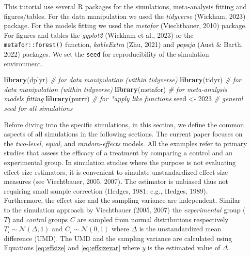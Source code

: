 \documentclass[
  man,floatsintext]{apa6}
\newenvironment{Shaded}{\begin{snugshade}}{\end{snugshade}}
\newcommand{\CommentTok}[1]{\textcolor[rgb]{0.56,0.35,0.01}{\textit{#1}}}
\newcommand{\DecValTok}[1]{\textcolor[rgb]{0.00,0.00,0.81}{#1}}
\newcommand{\FunctionTok}[1]{\textcolor[rgb]{0.13,0.29,0.53}{\textbf{#1}}}
\newcommand{\NormalTok}[1]{#1}
\newcommand{\OtherTok}[1]{\textcolor[rgb]{0.56,0.35,0.01}{#1}}
\begin{document}
\color{red}

This tutorial use several R packages for the simulations, meta-analysis fitting and figures/tables. For the data manipulation we used the \emph{tidyverse} (Wickham, 2023) package. For the models fitting we used the \emph{metafor} (Viechtbauer, 2010) package. For figures and tables the \emph{ggplot2} (Wickham et al., 2023) or the \texttt{metafor::forest()} function, \emph{kableExtra} (Zhu, 2021) and \emph{papaja} (Aust \& Barth, 2022) packages. We set the \texttt{seed} for reproducibility of the simulation environment.
\color{black}

\scriptsize

\begin{Shaded}
\begin{Highlighting}[]
\FunctionTok{library}\NormalTok{(dplyr) }\CommentTok{\# for data manipulation (within tidyverse)}
\FunctionTok{library}\NormalTok{(tidyr) }\CommentTok{\# for data manipulation (within tidyverse)}
\FunctionTok{library}\NormalTok{(metafor) }\CommentTok{\# for meta{-}analysis models fitting}
\FunctionTok{library}\NormalTok{(purrr) }\CommentTok{\# for *apply like functions}
\NormalTok{seed }\OtherTok{\textless{}{-}} \DecValTok{2023} \CommentTok{\# general seed for all simulations}
\end{Highlighting}
\end{Shaded}

\normalsize

\color{red}

Before diving into the specific simulations, in this section, we define the common aspects of all simulations in the following sections. The current paper focuses on the \emph{two-level}, \emph{equal,} and \emph{random-effects} models. All the examples refer to primary studies that assess the efficacy of a treatment by comparing a control and an experimental group. In simulation studies where the purpose is not evaluating effect size estimators, it is convenient to simulate unstandardized effect size measures (see Viechtbauer, 2005, 2007). The estimator is unbiased thus not requiring small sample correction (Hedges, 1981; e.g., Hedges, 1989). Furthermore, the effect size and the sampling variance are independent. Similar to the simulation approach by Viechtbauer (2005, 2007) the \emph{experimental} group (\(T\)) and \emph{control} groups \(C\) are sampled from normal distributions respectively \(T_i \sim \mathcal{N}(\Delta, 1)\) and \(C_i \sim \mathcal{N}(0, 1)\) where \(\Delta\) is the unstandardized mean difference (UMD). The UMD and the sampling variance are calculated using Equations \eqref{eq:effsize} and \eqref{eq:effsizevar} where \(y\) is the estimated value of \(\Delta\). \color{black}
\end{document}
